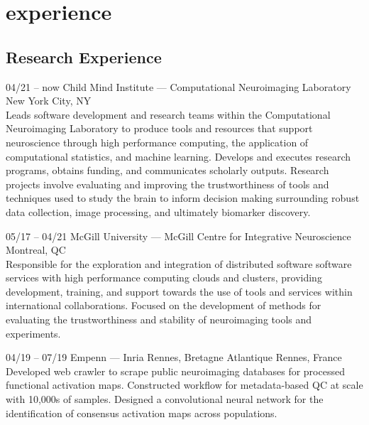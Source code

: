 \documentclass[]{friggeri-cv} %
\begin{document}

\section{experience}

\subsection{Research Experience}

\begin{entrylist}
\entry
{04/21 -- now}
{Child Mind Institute — Computational Neuroimaging Laboratory}
{New York City, NY}
{ \\
Leads software development and research teams within the Computational Neuroimaging Laboratory to produce tools and
resources that support neuroscience through high performance computing, the application of computational statistics,
and machine learning. Develops and executes research programs, obtains funding, and communicates scholarly outputs.
Research projects involve evaluating and improving the trustworthiness of tools and techniques used to study the brain
to inform decision making surrounding robust data collection, image processing, and ultimately biomarker discovery.}

\entry
{05/17 -- 04/21}
{McGill University — McGill Centre for Integrative Neuroscience}
{Montreal, QC}
{ \\
Responsible for the exploration and integration of distributed software software services with high
performance computing clouds and clusters, providing development, training, and support towards the
use of tools and services within international collaborations. Focused on the development of methods
for evaluating the trustworthiness and stability of neuroimaging tools and experiments.}


\entry
{04/19 -- 07/19}
{Empenn — Inria Rennes, Bretagne Atlantique}
{Rennes, France}
{\\
Developed web crawler to scrape public neuroimaging databases for processed functional activation maps. Constructed
workflow for metadata-based QC at scale with 10,000s of samples. Designed a convolutional neural network for the
identification of consensus activation maps across populations.}

\end{entrylist}
\end{document}

